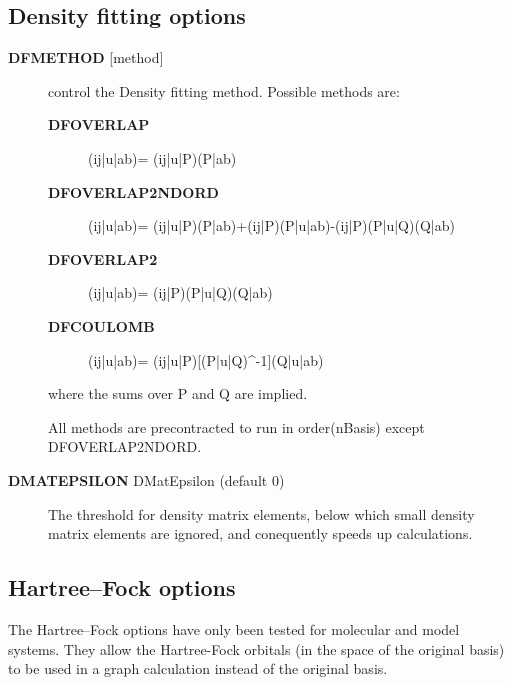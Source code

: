 \documentclass[openany,a4paper,10pt]{manual}
\begin{document}
\subsection{Density fitting options}
\begin{description}
\item[\textbf{DFMETHOD} {[}method{]}]
control the Density fitting method.
Possible methods are:
\begin{description}
\item[\textbf{DFOVERLAP}]
(ij|u|ab)= (ij|u|P)(P|ab)

\item[\textbf{DFOVERLAP2NDORD}]
(ij|u|ab)= (ij|u|P)(P|ab)+(ij|P)(P|u|ab)-(ij|P)(P|u|Q)(Q|ab)

\item[\textbf{DFOVERLAP2}]
(ij|u|ab)= (ij|P)(P|u|Q)(Q|ab)

\item[\textbf{DFCOULOMB}]
(ij|u|ab)= (ij|u|P){[}(P|u|Q)\textasciicircum{}-1{]}(Q|u|ab)

\end{description}

where the sums over P and Q are implied.

All methods are precontracted to run in order(nBasis) except
DFOVERLAP2NDORD.

\item[\textbf{DMATEPSILON} DMatEpsilon (default 0)]
The threshold for density matrix elements, below which small density
matrix elements are ignored, and conequently speeds up calculations.

\end{description}


\subsection{Hartree--Fock options}

The Hartree--Fock options have only been tested for molecular and model systems.
They allow the Hartree-Fock orbitals (in the space of the original basis) to be used
in a graph calculation instead of the original basis.
\end{document}
